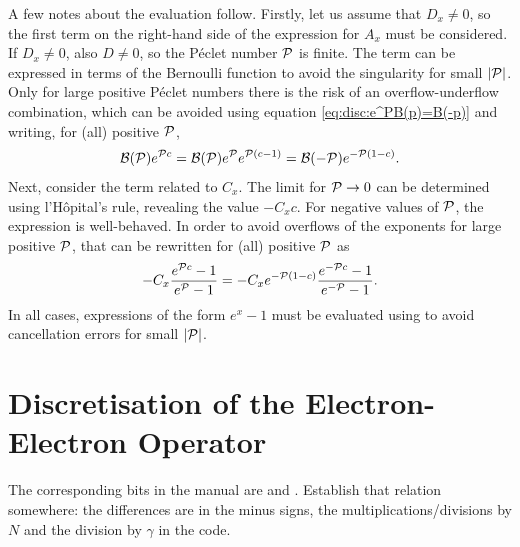 \documentclass{book}
\newcommand{\Pe}[0]{{\ensuremath{{\cal P}}}}
\begin{document}
A few notes about the evaluation follow. Firstly, let us assume that $D_x\neq 0$, so the
first term on the right-hand side of the expression for $A_x$ must be considered. If
$D_x\neq 0$, also $D\neq 0$, so the P\'eclet number $\Pe$ is finite. The term can be
expressed in terms of the Bernoulli function to avoid the singularity for small $|\Pe|$.
Only for large positive P\'eclet numbers there is the risk of an overflow-underflow combination,
which can be avoided using equation \eqref{eq:disc:e^PB(p)=B(-p)} and writing, for (all)
positive $\Pe$,
\begin{align}
	 {\cal B}(\Pe)e^{\Pe c}
	={\cal B}(\Pe)e^{\Pe}e^{\Pe(c-1)}
	={\cal B}(-\Pe)e^{-\Pe(1-c)}.
\end{align}
Next, consider the term related to $C_x$. The limit for $\Pe\rightarrow 0$ can be
determined using l'H\^opital's rule, revealing the value $-C_xc$. For negative values
of $\Pe$, the expression is well-behaved. In order to avoid overflows of the exponents
for large positive $\Pe$, that can be rewritten for (all) positive $\Pe$ as
\begin{equation}
	- C_x\frac{e^{\Pe c}-1}{e^{\Pe}-1}
	=
	-C_xe^{-\Pe(1-c)}\frac{e^{-\Pe c}-1}{e^{-\Pe}-1}.
\end{equation}
In all cases, expressions of the form $e^x-1$ must be evaluated using  to
avoid cancellation errors for small $|\Pe|$.

\section{Discretisation of the Electron-Electron Operator}

\begin{framed}
The corresponding bits in the manual are \cite[eqn. 38]{Manual_2_2_0}
and \cite[eqn. 39a--b]{Manual_2_2_0}. Establish that relation somewhere:
the differences are in the minus signs, the multiplications/divisions
by $N$ and the division by $\gamma$ in the code.
\end{framed}
\end{document}
